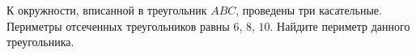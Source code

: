 \begin{ex}
	\begin{condition}
		 К окружности, вписанной в треугольник \( ABC \), проведены три касательные. Периметры отсеченных треугольников равны \( 6 \), \( 8 \), \( 10 \). Найдите периметр данного треугольника.
	\end{condition}
\end{ex}